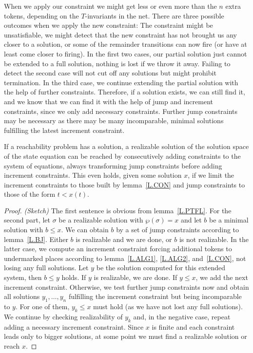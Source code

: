 \documentclass{LMCS}
\newcommand{\parikh}{\wp}
\begin{document}
When we apply our constraint we might get less or even more than the $n$ extra tokens, depending on the $T$-invariants in the net.
There are three possible outcomes when we apply the new constraint: The constraint might be unsatisfiable, we might detect
that the new constraint has not brought us any closer to a solution, or some of the remainder
transitions can now fire (or have at least come closer to firing). In the first two cases, our partial solution just cannot 
be extended to a full solution, nothing is lost if we throw it away. Failing to detect the second case will not cut off
any solutions but might prohibit termination. In the third case, we continue extending the partial
solution with the help of further constraints. Therefore, if a solution exists, we can still find it, and we know that we
can find it with the help of jump and increment constraints, since we only add necessary constraints. Further jump
constraints may be necessary as there may be many incomparable, minimal solutions fulfilling the latest increment constraint.


\begin{thm}
If a reachability problem has a solution, a realizable solution of the solution space of the state equation can be reached by consecutively adding constraints
to the system of equations, always transforming jump constraints before adding increment constraints.
This even holds, given some solution $x$, if we limit the increment constraints to those built by lemma~\ref{L.CON} and jump constraints to
those of the form $t<x(t)$.
\end{thm}
\begin{proof} {\em (Sketch)}
The first sentence is obvious from lemma~\ref{L.PTFL}. For the second part, let $\sigma$ be a realizable solution
with $\parikh(\sigma)=x$ and let $b$ be a minimal solution with $b\le x$. We can obtain $b$ by a set of jump
constraints according to lemma~\ref{L.BJ}. Either $b$ is realizable and we are done, or $b$ is not realizable.
In the latter case, we compute an increment constraint forcing additional tokens to undermarked places according
to lemma~\ref{L.ALG1}, \ref{L.ALG2}, and~\ref{L.CON}, not losing any full solutions. Let $y$ be the solution
computed for this extended system, then $b\le y$ holds. If $y$ is realizable, we are done. If $y\le x$, we add the next
increment constraint. Otherwise, we test further jump constraints now and obtain all solutions $y_1,\ldots,y_n$ 
fulfilling the increment constraint but being incomparable to $y$. For one of them, $y_k\le x$ must hold (as we
have not lost any full solutions). We continue by checking realizability of $y_k$ and, in the negative case,
repeat adding a necessary increment constraint. Since $x$ is finite and each constraint leads only to
bigger solutions, at some point we must find a realizable solution or reach $x$.
\end{proof}
\end{document}

